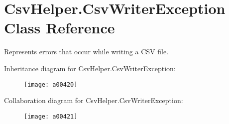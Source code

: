 \hypertarget{a00079}{\section{Csv\-Helper.\-Csv\-Writer\-Exception Class Reference}
\label{a00079}
}


Represents errors that occur while writing a C\-S\-V file.  




Inheritance diagram for Csv\-Helper.\-Csv\-Writer\-Exception\-:
\nopagebreak
\begin{figure}[H]
\begin{center}
\leavevmode
\texttt{[image: a00420]}
\end{center}
\end{figure}


Collaboration diagram for Csv\-Helper.\-Csv\-Writer\-Exception\-:
\nopagebreak
\begin{figure}[H]
\begin{center}
\leavevmode
\texttt{[image: a00421]}
\end{center}
\end{figure}
